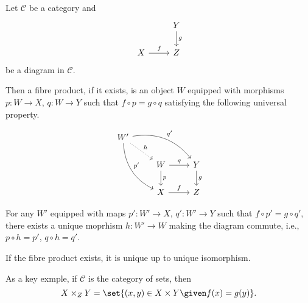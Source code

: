 Let $\mathcal{C}$ be a category and
\[\begin{tikzcd}
	& Y\ar[d, "g"]\\
	X\ar[r, "f"] & Z
\end{tikzcd}\]
be a diagram in $\mathcal{C}$.

Then a fibre product, if it exists, is an object $W$ equipped with morphisms $p\colon W\to X$, $q\colon W\to Y$
such that $f \circ p = g \circ q$ satisfying the following universal property.

\[\begin{tikzcd}
	W'\ar[dr, densely dotted, "h"]\ar[drr, bend left, "q'"]\ar[ddr, bend right, "p'"]\\
	&W\ar[r, "q"]\ar[d, "p"] & Y\ar[d, "g"]\\
	&X\ar[r, "f"] & Z
\end{tikzcd}\]

For any $W'$ equipped with maps $p'\colon W'\to X$, $q'\colon W'\to Y$ such that
$f \circ p' =g \circ q'$, there exists a unique moprhism $h\colon W'\to W$ making
the diagram commute, i.e., $p \circ h = p'$, $q \circ h = q'$.

If the fibre product exists, it is unique up to unique isomorphism.

As a key exmple, if $\mathcal{C}$ is the category of sets, then
\[ X\times_Z Y = \set{(x, y) \in X \times Y\given f(x) = g(y)}. \]

